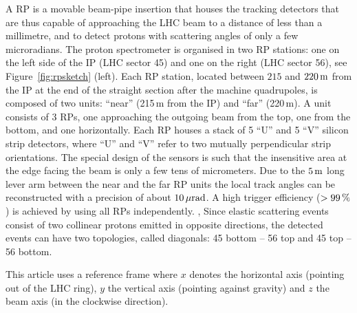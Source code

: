 A RP is a movable beam-pipe insertion that houses the tracking detectors that are thus capable of approaching the LHC beam to a distance of less than a millimetre, and to detect protons with scattering angles of only a few microradians. The proton spectrometer is organised in two RP stations: one on the left side of the IP (LHC sector 45) and one on the right (LHC sector 56), see Figure~\ref{fig:rpsketch} (left). Each RP station, located between $215$ and $220\,{\rm m}$ 
from the IP at the end of the straight section after the machine quadrupoles, is composed of two units: ``near'' (215\,m from the IP) and ``far'' (220\,m). A unit consists of 3 RPs, one approaching the outgoing beam from the top, one from the bottom, and one horizontally. Each RP houses a stack of 5 ``U'' and 5 ``V'' silicon strip detectors, where ``U'' and ``V'' refer to two mutually perpendicular strip orientations. The special design of the sensors is such that the insensitive area at the edge facing the beam is only a few tens of micrometers. Due to the $5\,{\rm m}$ 
 long lever arm between the near and the far RP units the local track angles can be reconstructed with a precision of about $10\,{\rm \mu rad}$. 
A high trigger efficiency ($> 99\,{\rm \%}$) is achieved by using all RPs independently. , 
Since elastic scattering events consist of two collinear protons emitted in opposite directions, the detected events can have two topologies, called diagonals: 45 bottom -- 56 top and 45 top -- 56 bottom.

This article uses a reference frame where $x$ denotes the horizontal axis (pointing out of the LHC ring), $y$ the vertical axis (pointing against gravity) and $z$ the beam axis (in the clockwise direction).
